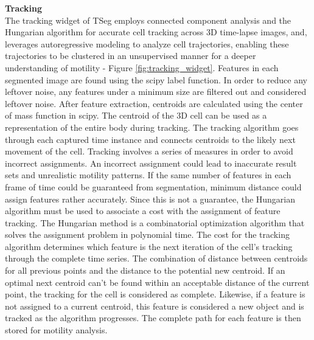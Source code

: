 \documentclass[./dissertation.tex]{subfiles}
\begin{document}
\textbf{Tracking} \\
The tracking widget of TSeg employs connected component analysis and the Hungarian algorithm for accurate cell tracking across 3D time-lapse images,  and, leverages autoregressive modeling to analyze cell trajectories, enabling these trajectories to be clustered in an unsupervised manner for a deeper understanding of motility - Figure \ref{fig:tracking_widget}. Features in each segmented image are found using the scipy label function. In order to reduce any leftover noise, any features under a minimum size are filtered out and considered leftover noise. After feature extraction, centroids are calculated using the center of mass function in scipy. The centroid of the 3D cell can be used as a representation of the entire body during tracking. The tracking algorithm goes through each captured time instance and connects centroids to the likely next movement of the cell. Tracking involves a series of measures in order to avoid incorrect assignments. An incorrect assignment could lead to inaccurate result sets and unrealistic motility patterns. If the same number of features in each frame of time could be guaranteed from segmentation, minimum distance could assign features rather accurately. Since this is not a guarantee, the Hungarian algorithm must be used to associate a cost with the assignment of feature tracking. The Hungarian method is a combinatorial optimization algorithm that solves the assignment problem in polynomial time. The cost for the tracking algorithm determines which feature is the next iteration of the cell's tracking through the complete time series. The combination of distance between centroids for all previous points and the distance to the potential new centroid. If an optimal next centroid can't be found within an acceptable distance of the current point, the tracking for the cell is considered as complete. Likewise, if a feature is not assigned to a current centroid, this feature is considered a new object and is tracked as the algorithm progresses. The complete path for each feature is then stored for motility analysis.
\end{document}
